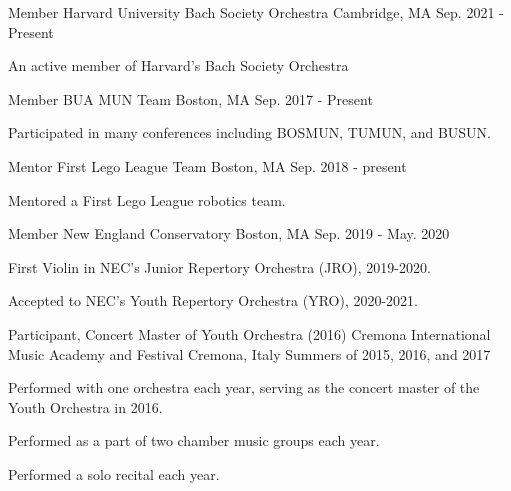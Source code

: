 \begin{cventries}

\cventry
	{Member}
	{Harvard University Bach Society Orchestra}
	{Cambridge, MA}
	{Sep. 2021 - Present}
	{
		\begin{cvitems}
		\item{An active member of Harvard's Bach Society Orchestra}
		\end{cvitems}
	}

  \cventry
    {Member} %
    {BUA MUN Team} %
    {Boston, MA} %
    {Sep. 2017 - Present} %
    {
      \begin{cvitems} %
        \item {Participated in many conferences including BOSMUN, TUMUN, and BUSUN.}
      \end{cvitems}
    }
    
  \cventry
    {Mentor}
    {First Lego League Team}
    {Boston, MA}
    {Sep. 2018 - present}
    {
     \begin{cvitems}
        \item {Mentored a First Lego League robotics team.}
    \end{cvitems}
    }
    
\cventry
    {Member}
    {New England Conservatory}
    {Boston, MA}
    {Sep. 2019 - May. 2020}
    {
     \begin{cvitems}
        \item {First Violin in NEC's Junior Repertory Orchestra (JRO), 2019-2020.}
        \item {Accepted to NEC's Youth Repertory Orchestra (YRO), 2020-2021.}
    \end{cvitems}
    }

  \cventry
    {Participant, Concert Master of Youth Orchestra (2016)}
    {Cremona International Music Academy and Festival}
    {Cremona, Italy}
    {Summers of 2015, 2016, and 2017}
    {
     \begin{cvitems}
        \item {Performed with one orchestra each year, serving as the concert master of the Youth Orchestra in 2016.}
        \item {Performed as a part of two chamber music groups each year.}
        \item {Performed a solo recital each year.}
    \end{cvitems}
    }
    
\end{cventries}